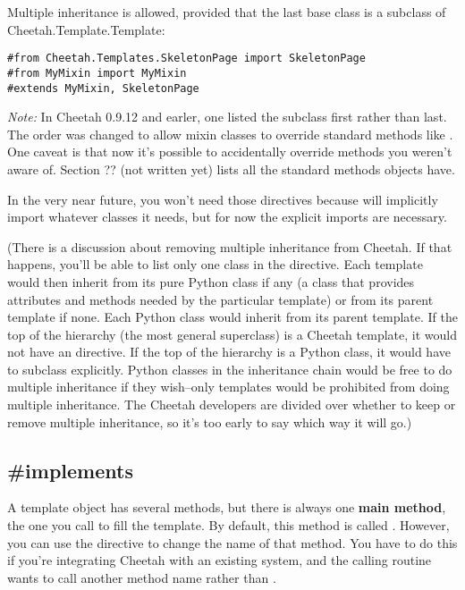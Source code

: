 Multiple inheritance is allowed, provided that the last base class is a
subclass of Cheetah.Template.Template:

\begin{verbatim}
#from Cheetah.Templates.SkeletonPage import SkeletonPage
#from MyMixin import MyMixin
#extends MyMixin, SkeletonPage
\end{verbatim}

{\em Note:} In Cheetah 0.9.12 and earler, one listed the  subclass
first rather than last.  The order was changed to allow mixin classes to override
standard methods like .  One caveat is that now it's possible to
accidentally override methods you weren't aware of.  Section ?? (not written yet)
lists all the standard methods  objects have.

In the very near future, you won't need those 
directives because  will implicitly import whatever 
classes it needs, but for now the explicit imports are necessary.

(There is a discussion about removing multiple inheritance from Cheetah.
If that happens, you'll be able to list only one class in the 
 directive.  Each template would then inherit from its
pure Python class if any (a class that provides attributes and methods
needed by the particular template) or from its parent template if none.
Each Python class would inherit from its parent template.  If the top of
the hierarchy (the most general superclass) is a Cheetah template, it would not
have an  directive.  If the top of the hierarchy is a Python
class, it would have to subclass  explicitly.
Python classes in the inheritance chain would be free to do multiple
inheritance if they wish--only templates would be prohibited from doing
multiple inheritance.  The Cheetah developers are divided over whether to keep
or remove multiple inheritance, so it's too early to say which way it will
go.)


\subsection{\#implements}
\label{inheritanceEtc.implements}


A template object has several methods, but there is always one {\bf main
method}, the one you call to fill the template.  By default, this method is
called .  However, you can use the 
directive to change the name of that method.  You have to do this if you're
integrating Cheetah with an existing system, and the calling routine wants to
call another method name rather than .

